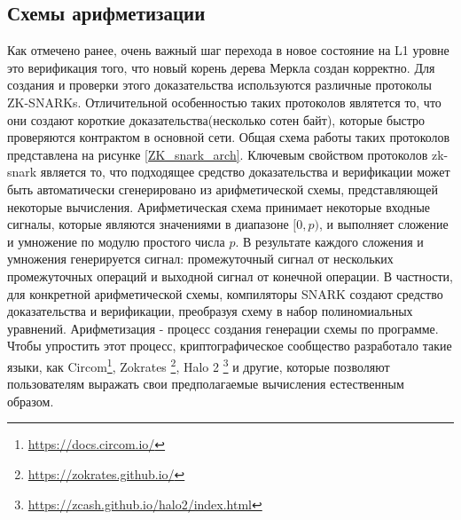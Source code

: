 \documentclass[a4paper]{article}
\begin{document}
\subsection{Схемы арифметизации}
\indent

Как отмечено ранее, очень важный шаг перехода в новое состояние на L1 уровне это верификация того, что новый корень дерева Меркла создан корректно. Для создания и проверки этого доказательства используются различные протоколы ZK-SNARKs. Отличительной особенностью таких протоколов являтется то, что они создают короткие доказательства(несколько сотен байт), которые быстро проверяются контрактом в основной сети. Общая схема работы таких протоколов представлена на рисунке \ref{ZK_snark_arch}. Ключевым свойством протоколов zk-snark является то, что подходящее средство доказательства и верификации может быть автоматически сгенерировано из арифметической схемы, представляющей некоторые вычисления. Арифметическая схема принимает некоторые входные сигналы, которые являются значениями в диапазоне $[0, p)$, и выполняет сложение и умножение по модулю простого числа $p$. В результате каждого сложения и умножения генерируется сигнал: промежуточный сигнал от нескольких промежуточных операций и выходной сигнал от конечной операции. В частности, для конкретной арифметической схемы, компиляторы SNARK создают средство доказательства и верификации, преобразуя схему в набор полиномиальных уравнений. Арифметизация - процесс создания генерации схемы по программе. Чтобы упростить этот процесс, криптографическое сообщество разработало такие языки, как Circom\footnote[1]{\href{https://docs.circom.io/}{https://docs.circom.io/}}, Zokrates \footnote[2]{\href{https://zokrates.github.io/}{https://zokrates.github.io/}}, Halo 2 \footnote[3]{\href{https://zcash.github.io/halo2/index.html}{https://zcash.github.io/halo2/index.html}} и другие, которые позволяют пользователям выражать свои предполагаемые вычисления естественным образом.
\end{document}

